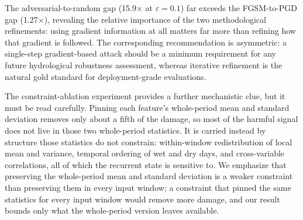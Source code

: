 \documentclass[final]{agujournal2019}
\begin{document}
The adversarial-to-random gap (15.9$\times$ at $\varepsilon = 0.1$) far exceeds the FGSM-to-PGD gap (1.27$\times$), revealing the relative importance of the two methodological refinements: using gradient information at all matters far more than refining how that gradient is followed. The corresponding recommendation is asymmetric: a single-step gradient-based attack should be a minimum requirement for any future hydrological robustness assessment, whereas iterative refinement is the natural gold standard for deployment-grade evaluations.

The constraint-ablation experiment provides a further mechanistic clue, but it must be read carefully. Pinning each feature's whole-period mean and standard deviation removes only about a fifth of the damage, so most of the harmful signal does not live in those two whole-period statistics. It is carried instead by structure those statistics do not constrain: within-window redistribution of local mean and variance, temporal ordering of wet and dry days, and cross-variable correlations, all of which the recurrent state is sensitive to. We emphasize that preserving the whole-period mean and standard deviation is a weaker constraint than preserving them in every input window; a constraint that pinned the same statistics for every input window would remove more damage, and our result bounds only what the whole-period version leaves available.
\end{document}

